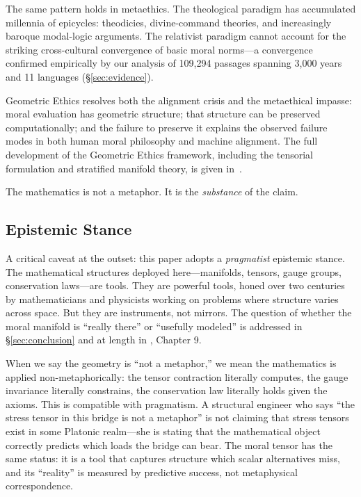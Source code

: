\documentclass[12pt,letterpaper]{article}
\theoremstyle{definition}
\theoremstyle{remark}
\begin{document}
The same pattern holds in metaethics. The theological paradigm has accumulated millennia of epicycles: theodicies, divine-command theories, and increasingly baroque modal-logic arguments. The relativist paradigm cannot account for the striking cross-cultural convergence of basic moral norms---a convergence confirmed empirically by our analysis of 109,294 passages spanning 3,000 years and 11 languages (\S\ref{sec:evidence}).

Geometric Ethics resolves both the alignment crisis and the metaethical impasse: moral evaluation has geometric structure; that structure can be preserved computationally; and the failure to preserve it explains the observed failure modes in both human moral philosophy and machine alignment. The full development of the Geometric Ethics framework, including the tensorial formulation and stratified manifold theory, is given in~\cite{bond2026geometric}.

The mathematics is not a metaphor. It is the \emph{substance} of the claim.

\subsection{Epistemic Stance}

A critical caveat at the outset: this paper adopts a \emph{pragmatist} epistemic stance. The mathematical structures deployed here---manifolds, tensors, gauge groups, conservation laws---are tools. They are powerful tools, honed over two centuries by mathematicians and physicists working on problems where structure varies across space. But they are instruments, not mirrors. The question of whether the moral manifold is ``really there'' or ``usefully modeled'' is addressed in \S\ref{sec:conclusion} and at length in \cite{bond2026geometric}, Chapter 9.

When we say the geometry is ``not a metaphor,'' we mean the mathematics is applied non-metaphorically: the tensor contraction literally computes, the gauge invariance literally constrains, the conservation law literally holds given the axioms. This is compatible with pragmatism. A structural engineer who says ``the stress tensor in this bridge is not a metaphor'' is not claiming that stress tensors exist in some Platonic realm---she is stating that the mathematical object correctly predicts which loads the bridge can bear. The moral tensor has the same status: it is a tool that captures structure which scalar alternatives miss, and its ``reality'' is measured by predictive success, not metaphysical correspondence.
\end{document}
